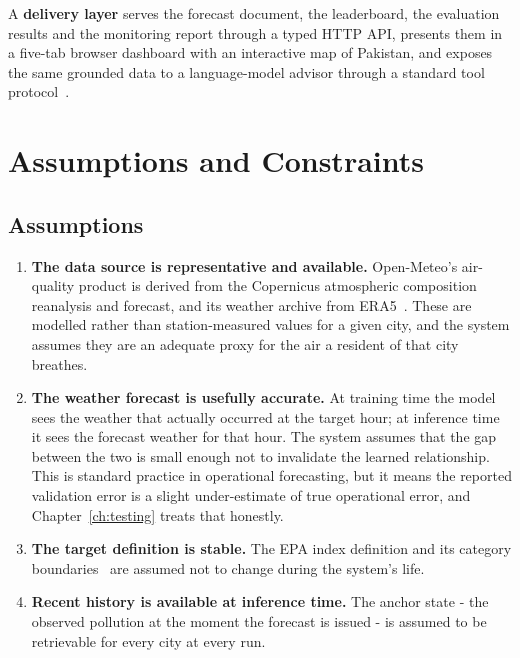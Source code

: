 A \textbf{delivery layer} serves the forecast document, the leaderboard, the
evaluation results and the monitoring report through a typed HTTP API, presents
them in a five-tab browser dashboard with an interactive map of Pakistan, and
exposes the same grounded data to a language-model advisor through a standard
tool protocol~\cite{ref:mcp}.

\section{Assumptions and Constraints}

\subsection{Assumptions}
\begin{enumerate}
  \item \textbf{The data source is representative and available.} Open-Meteo's
  air-quality product is derived from the Copernicus atmospheric composition
  reanalysis and forecast, and its weather archive from ERA5~\cite{ref:era5}.
  These are modelled rather than station-measured values for a given city, and
  the system assumes they are an adequate proxy for the air a resident of that
  city breathes.
  \item \textbf{The weather forecast is usefully accurate.} At training time the
  model sees the weather that actually occurred at the target hour; at inference
  time it sees the forecast weather for that hour. The system assumes that the
  gap between the two is small enough not to invalidate the learned relationship.
  This is standard practice in operational forecasting, but it means the reported
  validation error is a slight under-estimate of true operational error, and
  Chapter~\ref{ch:testing} treats that honestly.
  \item \textbf{The target definition is stable.} The EPA index definition and
  its category boundaries~\cite{ref:epa} are assumed not to change during the
  system's life.
  \item \textbf{Recent history is available at inference time.} The anchor state
  - the observed pollution at the moment the forecast is issued - is assumed to
  be retrievable for every city at every run.
\end{enumerate}

